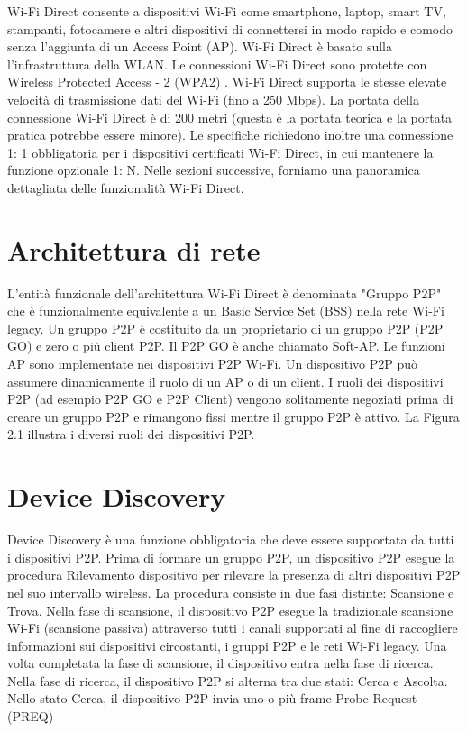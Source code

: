 Wi-Fi Direct consente a dispositivi Wi-Fi come smartphone, laptop, smart TV,
stampanti, fotocamere e altri dispositivi di connettersi in modo rapido e
comodo senza
l'aggiunta di un Access Point (AP). Wi-Fi Direct è basato sulla
l'infrastruttura
della WLAN. Le connessioni Wi-Fi Direct sono protette
con Wireless Protected Access - 2 (WPA2) \cite{mathews2007evolution}.
Wi-Fi Direct supporta le stesse elevate velocità di trasmissione dati del Wi-Fi
(fino a 250 Mbps).
La portata della connessione Wi-Fi Direct è di 200 metri (questa è la portata
teorica e la portata
pratica potrebbe essere minore). Le specifiche richiedono inoltre una
connessione
1: 1 obbligatoria per i dispositivi certificati Wi-Fi Direct, in cui mantenere
la funzione
opzionale 1: N. Nelle sezioni successive,
forniamo una panoramica dettagliata delle funzionalità Wi-Fi Direct.



\section{Architettura di rete}



L'entità funzionale dell'architettura Wi-Fi Direct è denominata
"Gruppo P2P" che è funzionalmente equivalente a un Basic Service Set
(BSS) nella rete Wi-Fi legacy. Un gruppo P2P è costituito da un proprietario
di un gruppo P2P (P2P GO) e zero o più client P2P. Il P2P GO
è anche chiamato Soft-AP. Le funzioni AP sono implementate nei dispositivi P2P
Wi-Fi.
Un dispositivo P2P può assumere dinamicamente il ruolo di un AP o di un client.
I ruoli
dei dispositivi P2P (ad esempio P2P GO e P2P Client) vengono solitamente
negoziati prima
di creare un gruppo P2P e rimangono fissi mentre il gruppo P2P è attivo. La
Figura 2.1 illustra
i diversi ruoli dei dispositivi P2P.



\section{Device Discovery}




Device Discovery è una funzione obbligatoria che deve essere supportata
da tutti i dispositivi P2P. Prima di formare un gruppo P2P, un dispositivo
P2P esegue la procedura Rilevamento dispositivo per rilevare la presenza di
altri dispositivi P2P nel suo intervallo wireless. La procedura consiste in
due fasi distinte: Scansione e Trova. Nella fase di scansione, il dispositivo
P2P esegue la tradizionale scansione Wi-Fi (scansione passiva) attraverso
tutti i canali supportati al fine di raccogliere informazioni sui dispositivi
circostanti, i gruppi P2P e le reti Wi-Fi legacy. Una volta completata la
fase di scansione, il dispositivo entra nella fase di ricerca. Nella
fase di ricerca, il dispositivo P2P si alterna tra due stati: Cerca
e Ascolta. Nello stato Cerca, il dispositivo P2P invia uno o più
frame Probe Request (PREQ)

